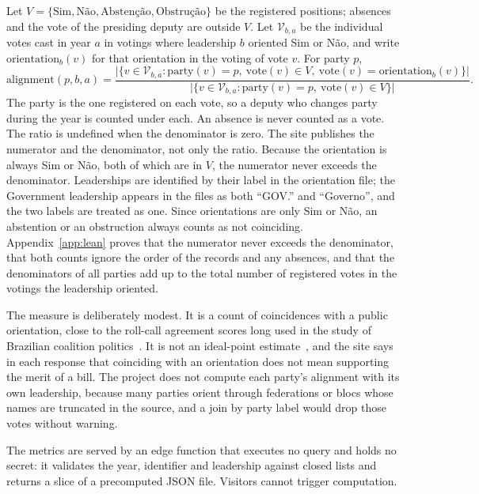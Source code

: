 Let $V=\{\text{Sim},\text{N\~ao},\text{Absten\c{c}\~ao},\text{Obstru\c{c}\~ao}\}$ be the registered positions; absences and the vote of the presiding deputy are outside $V$. Let $\mathcal{V}_{b,a}$ be the individual votes cast in year $a$ in votings where leadership $b$ oriented Sim or N\~ao, and write $\mathrm{orientation}_b(v)$ for that orientation in the voting of vote $v$. For party $p$,
\begin{equation}
\label{eq:alignment}
\mathrm{alignment}(p,b,a)=
\frac{\bigl|\{v\in\mathcal{V}_{b,a} : \mathrm{party}(v)=p,\ \mathrm{vote}(v)\in V,\ \mathrm{vote}(v)=\mathrm{orientation}_b(v)\}\bigr|}
     {\bigl|\{v\in\mathcal{V}_{b,a} : \mathrm{party}(v)=p,\ \mathrm{vote}(v)\in V\}\bigr|}.
\end{equation}
The party is the one registered on each vote, so a deputy who changes party during the year is counted under each. An absence is never counted as a vote. The ratio is undefined when the denominator is zero. The site publishes the numerator and the denominator, not only the ratio. Because the orientation is always Sim or N\~ao, both of which are in $V$, the numerator never exceeds the denominator. Leaderships are identified by their label in the orientation file; the Government leadership appears in the files as both ``GOV.'' and ``Governo'', and the two labels are treated as one. Since orientations are only Sim or N\~ao, an abstention or an obstruction always counts as not coinciding. Appendix~\ref{app:lean} proves that the numerator never exceeds the denominator, that both counts ignore the order of the records and any absences, and that the denominators of all parties add up to the total number of registered votes in the votings the leadership oriented.

The measure is deliberately modest. It is a count of coincidences with a public orientation, close to the roll-call agreement scores long used in the study of Brazilian coalition politics~\citep{figueiredo1999executivo}. It is not an ideal-point estimate~\citep{poole1997congress,clinton2004statistical}, and the site says in each response that coinciding with an orientation does not mean supporting the merit of a bill. The project does not compute each party's alignment with its own leadership, because many parties orient through federations or blocs whose names are truncated in the source, and a join by party label would drop those votes without warning.

The metrics are served by an edge function that executes no query and holds no secret: it validates the year, identifier and leadership against closed lists and returns a slice of a precomputed JSON file. Visitors cannot trigger computation.

